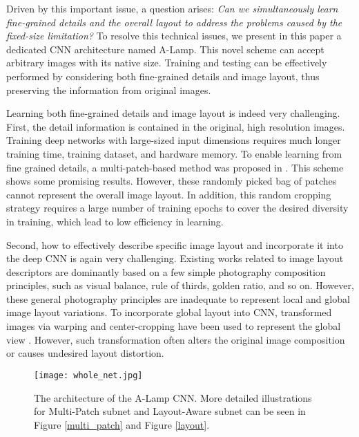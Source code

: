 \documentclass[10pt,twocolumn,letterpaper]{article}
\begin{document}
	Driven by this important issue, a question arises: \textit{Can we simultaneously learn fine-grained details and the overall layout to address the problems caused by the fixed-size limitation?} To resolve this technical issues, we present in this paper a dedicated CNN architecture named A-Lamp. This novel scheme can accept arbitrary images with its native size. Training and testing can be effectively performed by considering both fine-grained details and image layout, thus preserving the information from original images.
	
	Learning both fine-grained details and image layout is indeed very challenging.
	First, the detail information is contained in the original, high resolution images. Training deep networks with large-sized input dimensions requires much longer training time, training dataset, and hardware memory. To enable learning from fine grained details, a multi-patch-based method was proposed in \cite{Lu:2015:ICCV}. This scheme shows some promising results. However, these randomly picked bag of patches cannot represent the overall image layout. In addition, this random cropping strategy requires a large number of training epochs to cover the desired diversity in training, which lead to low efficiency in learning.
	
	Second, how to effectively describe specific image layout and incorporate it into the deep CNN is again very challenging. Existing works related to image layout descriptors are dominantly based on a few simple photography composition principles, such as visual balance, rule of thirds, golden ratio, and so on. However, these general photography principles are inadequate to represent local and global image layout variations. To incorporate global layout into CNN, transformed images via warping and center-cropping have been used to represent the global view \cite{Lu:2014:TMM:rating}.
	However, such transformation often alters the original image composition or causes undesired layout distortion. 
	
	\begin{figure}
		\centering
		\texttt{[image: whole\_net.jpg]}
		\caption{The architecture of the A-Lamp CNN. More detailed illustrations for Multi-Patch subnet and Layout-Aware subnet can be seen in Figure \ref{multi_patch} and Figure \ref{layout}.}
		\label{whole_net}
		\vspace{-3mm}
	\end{figure}
	
\end{document}
